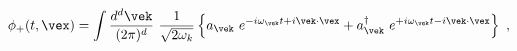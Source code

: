 \begin{equation}
  \phi_+ (t,\vex ) = \int \frac{d^d\vek}{(2\pi )^d}~\frac{1}{\sqrt{2\omega_k}}
  \left\{ a_{\vek}~e^{-i\omega_{\vek} t + i\vek \cdot \vex }
  +  a^{\dagger}_{\vek}~e^{+i\omega_{\vek} t - i\vek \cdot \vex }
  \right\} \ ,
\end{equation}

